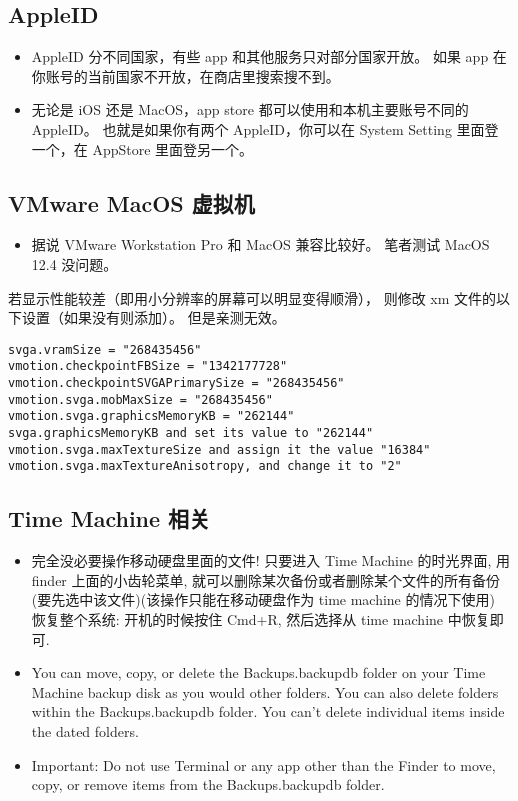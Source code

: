 \subsection{AppleID}
\begin{itemize}
\item AppleID 分不同国家，有些 app 和其他服务只对部分国家开放。 如果 app 在你账号的当前国家不开放，在商店里搜索搜不到。
\item 无论是 iOS 还是 MacOS，app store 都可以使用和本机主要账号不同的 AppleID。 也就是如果你有两个 AppleID，你可以在 System Setting 里面登一个，在 AppStore 里面登另一个。
\end{itemize}

\subsection{VMware MacOS 虚拟机}
\begin{itemize}
\item 据说 VMware Workstation Pro 和 MacOS 兼容比较好。 笔者测试 MacOS 12.4 没问题。
\end{itemize}

若显示性能较差（即用小分辨率的屏幕可以明显变得顺滑）， 则修改 xm 文件的以下设置（如果没有则添加）。 但是亲测无效。
\begin{lstlisting}[language=none]
svga.vramSize = "268435456"
vmotion.checkpointFBSize = "1342177728"
vmotion.checkpointSVGAPrimarySize = "268435456"
vmotion.svga.mobMaxSize = "268435456"
vmotion.svga.graphicsMemoryKB = "262144"
svga.graphicsMemoryKB and set its value to "262144"
vmotion.svga.maxTextureSize and assign it the value "16384"
vmotion.svga.maxTextureAnisotropy, and change it to "2"
\end{lstlisting}

\subsection{Time Machine 相关}
\begin{itemize}
\item 完全没必要操作移动硬盘里面的文件! 只要进入 Time Machine 的时光界面, 用 finder 上面的小齿轮菜单, 就可以删除某次备份或者删除某个文件的所有备份 (要先选中该文件)(该操作只能在移动硬盘作为 time machine 的情况下使用)
恢复整个系统: 开机的时候按住 Cmd+R, 然后选择从 time machine 中恢复即可.
\item You can move, copy, or delete the Backups.backupdb folder on your Time Machine backup disk as you would other folders. You can also delete folders within the Backups.backupdb folder. You can’t delete individual items inside the dated folders.
\item Important: Do not use Terminal or any app other than the Finder to move, copy, or remove items from the Backups.backupdb folder.
\end{itemize}

